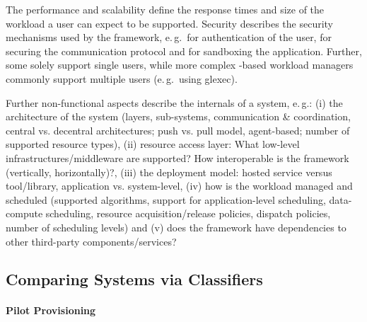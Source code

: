 \documentclass{sig-alternate}
\begin{document}
The performance and scalability define the response times and size of the
workload a user can expect to be supported. Security describes the security
mechanisms used by the framework, e.\,g.\ for authentication of the user, for
securing the communication protocol and for sandboxing the application.
Further, some \pilotjobs solely support single users, while more complex
\pilot-based workload managers commonly support multiple users (e.\,g.\ using
glexec).

Further non-functional aspects describe the internals of a \pilotjob system,
e.\,g.: (i) the architecture of the system (layers, sub-systems,
communication \& coordination, central vs. decentral architectures; push vs.
pull model, agent-based; number of supported resource types), (ii) resource
access layer: What low-level infrastructures/middleware are supported? How
interoperable is the framework (vertically, horizontally)?, (iii) the
deployment model: hosted service versus tool/library, application vs.
system-level, (iv) how is the workload managed and scheduled (supported
algorithms, support for application-level scheduling, data-compute scheduling,
resource acquisition/release policies, dispatch policies, number of scheduling
levels) and (v) does the framework have dependencies to other third-party
components/services?

\subsection{Comparing \pilot Systems via Classifiers}



\paragraph{Pilot Provisioning}
\end{document}
